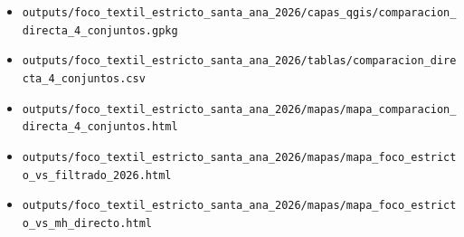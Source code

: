 \documentclass[11pt]{article}
\begin{document}
\begin{itemize}

\item \texttt{outputs/foco\_textil\_estricto\_santa\_ana\_2026/capas\_qgis/comparacion\_directa\_4\_conjuntos.gpkg}

\item \texttt{outputs/foco\_textil\_estricto\_santa\_ana\_2026/tablas/comparacion\_directa\_4\_conjuntos.csv}

\item \texttt{outputs/foco\_textil\_estricto\_santa\_ana\_2026/mapas/mapa\_comparacion\_directa\_4\_conjuntos.html}

\item \texttt{outputs/foco\_textil\_estricto\_santa\_ana\_2026/mapas/mapa\_foco\_estricto\_vs\_filtrado\_2026.html}

\item \texttt{outputs/foco\_textil\_estricto\_santa\_ana\_2026/mapas/mapa\_foco\_estricto\_vs\_mh\_directo.html}

\end{itemize}
\end{document}
